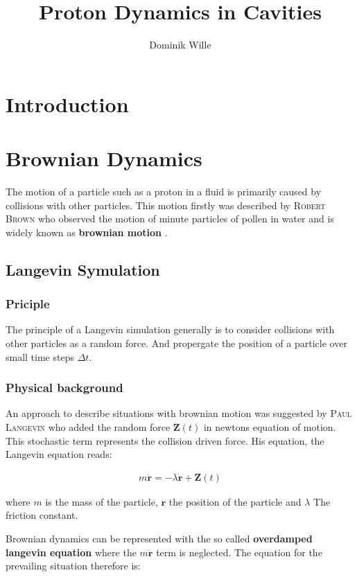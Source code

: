 \documentclass[a4paper, parskip=half]{scrartcl}
\title{Proton Dynamics in Cavities}
\author{Dominik Wille}
\newcommand{\person}[1]{%
	\textsc{#1}%
}
\newcommand{\effect}[1]{%
	\textbf{#1}%
}
\begin{document}
\maketitle
\thispagestyle{empty}
\newpage
\tableofcontents
\thispagestyle{empty}
\newpage
\setcounter{page}{1}

\section{Introduction}


\section{Brownian Dynamics}
The motion of a particle such as a proton in a fluid is primarily  caused by collisions with other particles. This motion firstly was described by \person{Robert Brown} who observed the motion of minute particles of pollen in water and is widely known as \effect{brownian motion}.
\subsection{Langevin Symulation}
\subsubsection{Priciple}
The principle of a Langevin simulation generally is to consider collisions with other particles as a random force. And propergate the position of a particle over small time steps $\Delta t$.
\subsubsection{Physical background}
An approach to describe situations with brownian motion was suggested by \person{Paul Langevin} who added the random force $\mathbf{Z}(t)$ in newtons equation of motion. This stochastic term represents the collision driven force. His equation, the Langevin equation reads:

\begin{align}
m \ddot{\mathbf{r}} = -\lambda\dot{\mathbf{r}} + \mathbf{Z}(t)
\end{align}

where $m$ is the mass of the particle, $\mathbf{r}$ the position of the particle and $\lambda$ The friction constant.

Brownian dynamics can be represented with the so called \effect{overdamped langevin equation} where the $m \ddot{\mathbf{r}}$ term is neglected. The equation for the prevailing situation therefore is:
\end{document}

